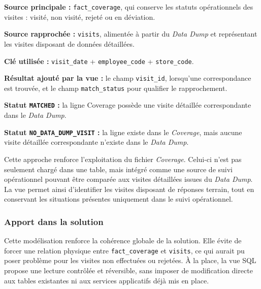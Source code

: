 \begin{tcolorbox}[technicalbox,title={Logique de la vue de rapprochement}]
\small

\textbf{Source principale :} \texttt{fact\_coverage}, qui conserve les statuts opérationnels des visites : visité, non visité, rejeté ou en déviation.

\vspace{0.12cm}

\textbf{Source rapprochée :} \texttt{visits}, alimentée à partir du \textit{Data Dump} et représentant les visites disposant de données détaillées.

\vspace{0.12cm}

\textbf{Clé utilisée :} \texttt{visit\_date} + \texttt{employee\_code} + \texttt{store\_code}.

\vspace{0.12cm}

\textbf{Résultat ajouté par la vue :} le champ \texttt{visit\_id}, lorsqu’une correspondance est trouvée, et le champ \texttt{match\_status} pour qualifier le rapprochement.

\vspace{0.12cm}

\textbf{Statut \texttt{MATCHED} :} la ligne Coverage possède une visite détaillée correspondante dans le \textit{Data Dump}.

\vspace{0.12cm}

\textbf{Statut \texttt{NO\_DATA\_DUMP\_VISIT} :} la ligne existe dans le \textit{Coverage}, mais aucune visite détaillée correspondante n’existe dans le \textit{Data Dump}.
\end{tcolorbox}

Cette approche renforce l’exploitation du fichier \textit{Coverage}. Celui-ci n’est pas seulement chargé dans une table, mais intégré comme une source de suivi opérationnel pouvant être comparée aux visites détaillées issues du \textit{Data Dump}. La vue permet ainsi d’identifier les visites disposant de réponses terrain, tout en conservant les situations présentes uniquement dans le suivi opérationnel.

\subsubsection{Apport dans la solution}

Cette modélisation renforce la cohérence globale de la solution. Elle évite de forcer une relation physique entre \texttt{fact\_coverage} et \texttt{visits}, ce qui aurait pu poser problème pour les visites non effectuées ou rejetées. À la place, la vue SQL propose une lecture contrôlée et réversible, sans imposer de modification directe aux tables existantes ni aux services applicatifs déjà mis en place.

